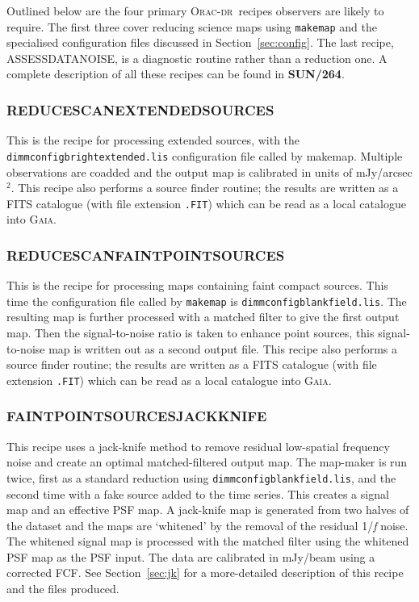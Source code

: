 \documentclass[twoside,11pt]{article}
\newcommand{\htmladdnormallink}[2]{#1}
\newcommand{\htmlref}[2]{#1}
\newcommand{\latexhtml}[2]{#1}
\newcommand{\xref}[3]{#1}
\newcommand{\xlabel}[1]{}
\renewcommand{\_}{\texttt{\symbol{95}}}
\newcommand{\gaia}{\xref{\textsc{Gaia}}{sun214}{}}
\newcommand{\oracdr}{\htmladdnormallink{\textsc{Orac-dr}}{http://www.oracdr.org/oracdr}}
\newcommand{\task}[1]{\textsf{#1}}
\newcommand{\makemap}{\xref{\task{makemap}}{sun258}{MAKEMAP}}
\newcommand{\pipelinesun}{\xref{\textbf{SUN/264}}{sun264}{}}
\newcommand{\cref}[3]{\latexhtml{#1~\ref{#2}}{\htmlref{#3}{#2}}}
\begin{document}
Outlined below are the four primary \oracdr\ recipes observers are
likely to require.  The first three cover reducing science maps using
\texttt{makemap} and the specialised configuration files discussed in
\cref{Section}{sec:config}{Specialised configuration files}. The last
recipe, ASSESS\_DATA\_NOISE, is a diagnostic routine rather than a
reduction one. A complete description of all these recipes can be
found in \pipelinesun.


\subsubsection{\xlabel{extsources}REDUCE\_SCAN\_EXTENDED\_SOURCES}

This is the recipe for processing extended sources, with the
\texttt{dimmconfig\_bright\_extended.lis} configuration file called by
\makemap. Multiple observations are coadded and the output
map is calibrated in units of mJy/arcsec$^2$. This recipe also
performs a source finder routine; the results are written as a FITS
catalogue (with file extension \texttt{.FIT}) which can be read as a
local catalogue into \gaia.

\subsubsection{\xlabel{faint}REDUCE\_SCAN\_FAINT\_POINT\_SOURCES}

This is the recipe for processing maps containing faint compact
sources. This time the configuration file called by \texttt{makemap}
is \texttt{dimmconfig\_blank\_field.lis}. The resulting map is further
processed with a matched filter to give the first output map. Then the
signal-to-noise ratio is taken to enhance point sources, this
signal-to-noise map is written out as a second output file. This
recipe also performs a source finder routine; the results are written
as a FITS catalogue (with file extension \texttt{.FIT}) which can be
read as a local catalogue into \gaia.

\subsubsection{\xlabel{faintjk}FAINT\_POINT\_SOURCES\_JACKKNIFE}

This recipe uses a jack-knife method to remove residual low-spatial
frequency noise and create an optimal matched-filtered output map. The
map-maker is run twice, first as a standard reduction using
\texttt{dimmconfig\_blank\_field.lis}, and the second time with a fake
source added to the time series. This creates a signal map and an
effective PSF map. A jack-knife map is generated from two halves of
the dataset and the maps are `whitened' by the removal of the residual
1/\emph{f} noise. The whitened signal map is processed with the
matched filter using the whitened PSF map as the PSF input. The data
are calibrated in mJy/beam using a corrected FCF. See
\cref{Section}{sec:jk}{Example 2 - Advanced pipeline method} for a
more-detailed description of this recipe and the files produced.
\end{document}
